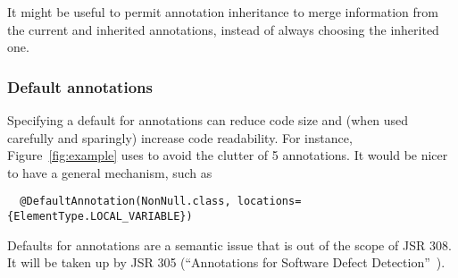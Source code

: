 \documentclass[10pt]{article}
\begin{document}
It might be useful to permit annotation inheritance to merge
information from the current and inherited annotations, instead of always
choosing the inherited one.





% 
% 

\subsubsection{Default annotations}

Specifying a default for annotations can reduce code size and (when used
carefully and sparingly) increase code readability.  For instance,
Figure~\ref{fig:example} uses  to avoid the clutter of 5
 annotations.  It would be nicer to have a general mechanism,
such as
\begin{Verbatim}
  @DefaultAnnotation(NonNull.class, locations={ElementType.LOCAL_VARIABLE})
\end{Verbatim}
Defaults for annotations are a semantic issue that is
out of the scope of JSR 308.  It will be taken up by JSR 305 (``Annotations
for Software Defect Detection''~\cite{JSR305}).
\end{document}
